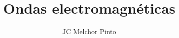 \documentclass[12pt,addpoints]{guia}
\title{Ondas electromagnéticas}
\author{JC Melchor Pinto}
\begin{document}
\INFO%


\ejemplosboxed[]%
\begin{questions}
    \questionboxed[20]{}
    \questionboxed[20]{}
    
    \questionboxed[10]{}
    \questionboxed[10]{}
    \questionboxed[15]{}
    
    \questionboxed[25]{}
\end{questions}
\end{document}
